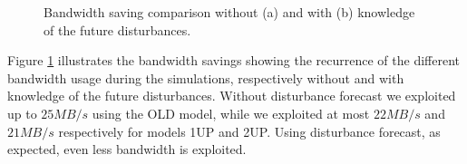 \begin{figure}[h!]
\centering
{}
\caption{Bandwidth saving comparison without (a) and with (b) knowledge of the future disturbances.}
\label{fig:BW}
\end{figure}

Figure \ref{fig:BW} illustrates the bandwidth savings showing the recurrence of the different bandwidth usage during the simulations, respectively without and with knowledge of the future disturbances. Without disturbance forecast we exploited up to $25MB/s$ using the OLD model, while we exploited at most $22MB/s$ and $21MB/s$ respectively for models 1UP and 2UP. Using disturbance forecast, as expected, even less bandwidth is exploited.

